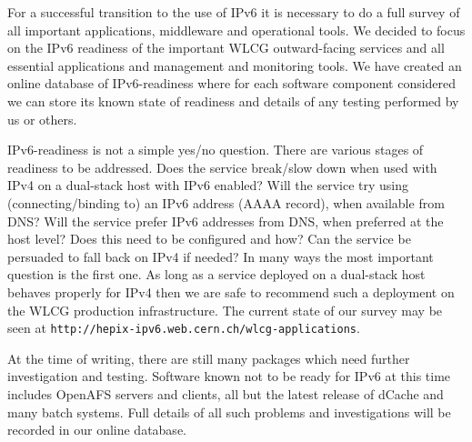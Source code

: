 For a successful transition to the use of IPv6 it is necessary to do a full survey of all important applications, middleware and operational tools. We decided to focus on the IPv6 readiness of the important WLCG outward-facing services and all essential applications and management and monitoring tools. We have created an online database of IPv6-readiness where for each software component considered we can store its known state of readiness and details of any testing performed by us or others.

IPv6-readiness is not a simple yes/no question. There are various stages of readiness to be addressed.
Does the service break/slow down when used with IPv4 on a dual-stack host with IPv6 enabled?
Will the service try using (connecting/binding to) an IPv6 address (AAAA record), when available from DNS?
Will the service prefer IPv6 addresses from DNS, when preferred at the host level?
Does this need to be configured and how?
Can the service be persuaded to fall back on IPv4 if needed?
In many ways the most important question is the first one. As long as a service deployed on a dual-stack host behaves properly for IPv4 then we are safe to recommend such a deployment on the WLCG production infrastructure.
The current state of our survey may be seen at
{\tt http://hepix-ipv6.web.cern.ch/wlcg-applications}.

At the time of 
writing, there are still many packages which need further investigation and testing. Software known not to be ready for IPv6 at this time includes OpenAFS servers and clients, all but the latest release of dCache and many batch systems. Full details of all such problems and investigations will be recorded in our online database.


